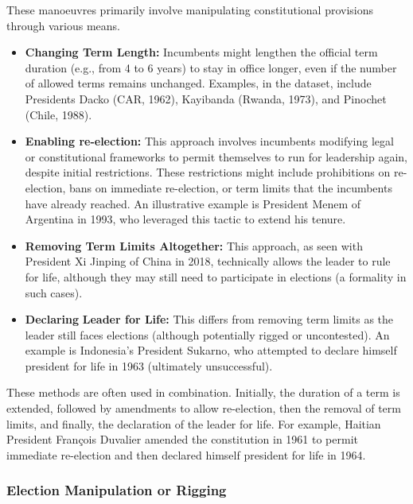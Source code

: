 \documentclass[
  12pt,
]{report}
\begin{document}
These manoeuvres primarily involve manipulating constitutional
provisions through various means.

\begin{itemize}
\item
  \textbf{Changing Term Length:} Incumbents might lengthen the official
  term duration (e.g., from 4 to 6 years) to stay in office longer, even
  if the number of allowed terms remains unchanged. Examples, in the
  dataset, include Presidents Dacko (CAR, 1962), Kayibanda (Rwanda,
  1973), and Pinochet (Chile, 1988).
\item
  \textbf{Enabling re-election:} This approach involves incumbents
  modifying legal or constitutional frameworks to permit themselves to
  run for leadership again, despite initial restrictions. These
  restrictions might include prohibitions on re-election, bans on
  immediate re-election, or term limits that the incumbents have already
  reached. An illustrative example is President Menem of Argentina in
  1993, who leveraged this tactic to extend his tenure.
\item
  \textbf{Removing Term Limits Altogether:} This approach, as seen with
  President Xi Jinping of China in 2018, technically allows the leader
  to rule for life, although they may still need to participate in
  elections (a formality in such cases).
\item
  \textbf{Declaring} \textbf{Leader for Life:} This differs from
  removing term limits as the leader still faces elections (although
  potentially rigged or uncontested). An example is Indonesia's
  President Sukarno, who attempted to declare himself president for life
  in 1963 (ultimately unsuccessful).
\end{itemize}

These methods are often used in combination. Initially, the duration of
a term is extended, followed by amendments to allow re-election, then
the removal of term limits, and finally, the declaration of the leader
for life. For example, Haitian President François Duvalier amended the
constitution in 1961 to permit immediate re-election and then declared
himself president for life in 1964.

\subsubsection*{Election Manipulation or
Rigging}\label{election-manipulation-or-rigging}
\end{document}
